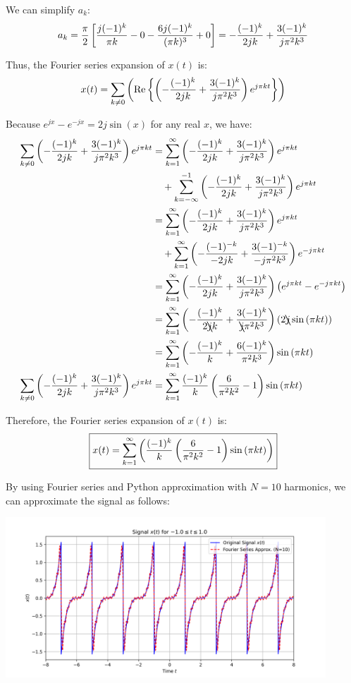 \documentclass[a4paper, 10pt]{article}
\begin{document}
\begin{solution}
We can simplify \( a_k \):
\[ a_k = \frac{\pi}{2} \left[ \frac{j (-1)^{k}}{\pi k} - 0 - \frac{6 j (-1)^{k}}{(\pi k)^3} + 0 \right] = - \frac{(-1)^{k}}{2jk} + \frac{3 (-1)^{k}}{j \pi^2 k^3} \]

Thus, the Fourier series expansion of \( x(t) \) is:
\[ x(t) = \sum_{k \neq 0} \left( \text{Re} \left\{ \left( - \frac{(-1)^{k}}{2jk} + \frac{3 (-1)^{k}}{j \pi^2 k^3} \right) e^{j \pi k t} \right\} \right) \]

\newpage

Because \( e^{jx} - e^{-jx} = 2j\sin{(x)} \) for any real \( x \), we have:
\begin{align*}
    \sum_{k \neq 0} \left( - \frac{(-1)^{k}}{2jk} + \frac{3 (-1)^{k}}{j \pi^2 k^3} \right) e^{j \pi k t} &= \sum_{k=1}^{\infty} \left( - \frac{(-1)^{k}}{2jk} + \frac{3 (-1)^{k}}{j \pi^2 k^3} \right) e^{j \pi k t} \\
    &\quad + \sum_{k=-\infty}^{-1} \left( - \frac{(-1)^{k}}{2jk} + \frac{3 (-1)^{k}}{j \pi^2 k^3} \right) e^{j \pi k t} \\
    &= \sum_{k=1}^{\infty} \left( - \frac{(-1)^{k}}{2jk} + \frac{3 (-1)^{k}}{j \pi^2 k^3} \right) e^{j \pi k t} \\
    &\quad + \sum_{k=1}^{\infty} \left( - \frac{(-1)^{-k}}{-2jk} + \frac{3 (-1)^{-k}}{-j \pi^2 k^3} \right) e^{-j \pi k t} \\
    &= \sum_{k=1}^{\infty} \left( - \frac{(-1)^{k}}{2jk} + \frac{3 (-1)^{k}}{j \pi^2 k^3} \right) \left( e^{j \pi k t} - e^{-j \pi k t} \right) \\
    &= \sum_{k=1}^{\infty} \left( - \frac{(-1)^{k}}{2 \bcancel{j} k} + \frac{3 (-1)^{k}}{\bcancel{j} \pi^2 k^3} \right) \left( 2 \bcancel{j} \sin{(\pi k t)} \right) \\
    &= \sum_{k=1}^{\infty} \left( - \frac{(-1)^{k}}{k} + \frac{6 (-1)^{k}}{\pi^2 k^3} \right) \sin{(\pi k t)} \\
    \sum_{k \neq 0} \left( - \frac{(-1)^{k}}{2jk} + \frac{3 (-1)^{k}}{j \pi^2 k^3} \right) e^{j \pi k t} &= \sum_{k=1}^{\infty} \frac{(-1)^k}{k} \left( \frac{6}{\pi^2 k^2} - 1 \right) \sin{(\pi k t)}
\end{align*}

Therefore, the Fourier series expansion of \( x(t) \) is:
\[ \boxed{ x(t) = \sum_{k=1}^{\infty} \left( \frac{(-1)^k}{k} \left( \frac{6}{\pi^2 k^2} - 1 \right) \sin{(\pi k t)} \right) } \]

By using Fourier series and Python approximation with \( N = 10 \) harmonics, we can approximate the signal as follows:
\begin{center}
    \includegraphics[width=0.9\textwidth]{images/problem_2_1.png}
\end{center}
\end{solution}
\end{document}
